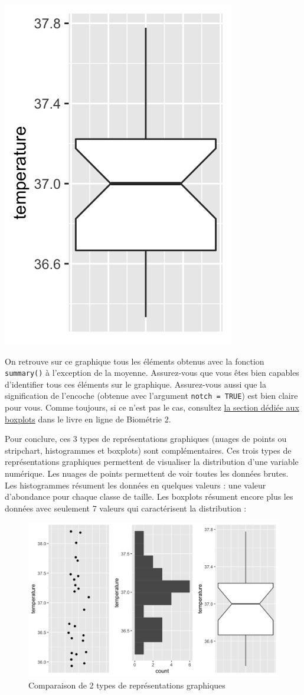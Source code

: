 \documentclass[a4paperpaper,]{article}
\begin{document}
\begin{center}\includegraphics[width=0.25\linewidth]{figure/unnamed-chunk-20-1} \end{center}

On retrouve sur ce graphique tous les éléments obtenus avec la fonction \texttt{summary()} à l'exception de la moyenne. Assurez-vous que vous êtes bien capables d'identifier tous ces éléments sur le graphique. Assurez-vous aussi que la signification de l'encoche (obtenue avec l'argument \texttt{notch\ =\ TRUE}) est bien claire pour vous. Comme toujours, si ce n'est pas le cas, consultez \href{https://besibo.github.io/DA/viz.html\#les-boites-a-moustaches-ou-boxplots}{la section dédiée aux boxplots} dans le livre en ligne de Biométrie 2.

Pour conclure, ces 3 types de représentations graphiques (nuages de points ou stripchart, histogrammes et boxplots) sont complémentaires. Ces trois types de représentations graphiques permettent de visualiser la distribution d'une variable numérique. Les nuages de points permettent de voir toutes les données brutes. Les histogrammes résument les données en quelques valeurs : une valeur d'abondance pour chaque classe de taille. Les boxplots résument encore plus les données avec seulement 7 valeurs qui caractérisent la distribution :

\begin{figure}[htpb]

{\centering \includegraphics[width=0.9\linewidth]{figure/unnamed-chunk-21-1} 

}

\caption{Comparaison de 2 types de représentations graphiques}\label{fig:unnamed-chunk-21}
\end{figure}
\end{document}
